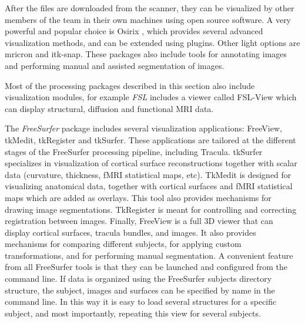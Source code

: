 
After the files are downloaded from the scanner, they can be visualized by other members of the team in their own machines using open source software. A very powerful and popular choice is Osirix \autocite{rosset_osirix:_2004}, which provides several advanced visualization methods, and can be extended using plugins. Other light options are mricron and itk-snap. These packages also include tools for annotating images and performing manual and assisted segmentation of images.


Most of the processing packages described in this section also include visualization modules, for example \emph{FSL} includes a viewer called FSL-View which can display structural, diffusion and functional MRI data. 


The \emph{FreeSurfer} package includes several visualization applications: FreeView, tkMedit, tkRegister and tkSurfer. These applications are tailored at the different stages of the FreeSurfer processing pipeline, including Tracula. tkSurfer specializes in visualization of cortical surface reconstructions together with scalar data (curvature, thickness, fMRI statistical maps, etc). TkMedit is designed for visualizing anatomical data, together with cortical surfaces and fMRI statistical maps which are added as overlays. This tool also provides mechanisms for drawing image segmentations. TkRegister is meant for controlling and correcting registration between images. Finally, FreeView is a full 3D viewer that can display cortical surfaces, tracula bundles, and images. It also provides mechanisms for comparing different subjects, for applying custom transformations, and for performing manual segmentation. A convenient feature from all FreeSurfer tools is that they can be launched and configured from the command line. If data is organized using the FreeSurfer subjects directory structure, the subject, images and surfaces can be specified by name in the command line. In this way it is easy to load several structures for a specific subject, and most importantly, repeating this view for several subjects. 


